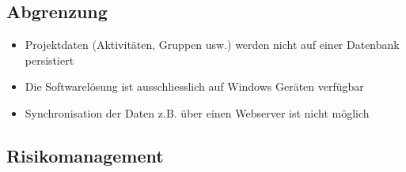\subsection{Abgrenzung}
\begin{itemize}
    \item Projektdaten (Aktivitäten, Gruppen usw.) werden nicht auf einer Datenbank persistiert
    \item Die Softwarelösung ist ausschliesslich auf Windows Geräten verfügbar
    \item Synchronisation der Daten z.B. über einen Webserver ist nicht möglich
\end{itemize}
\newpage

\subsection{Risikomanagement}
